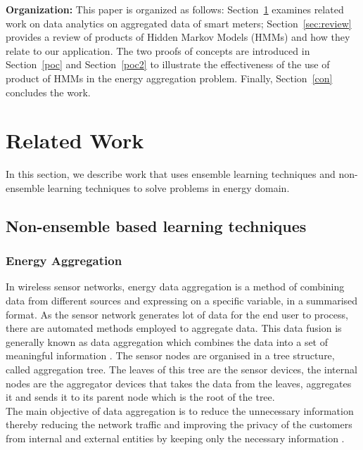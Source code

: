 \documentclass[conference]{IEEEtran}
\begin{document}
\noindent \textbf{Organization:} This paper is organized as follows: Section~\ref{related} examines related work on data analytics on aggregated data of smart meters; Section~\ref{sec:review} provides a review of products of Hidden Markov Models (HMMs) and how they relate to our application. The two proofs of concepts are introduced in Section~\ref{poc} and Section~\ref{poc2} to illustrate the effectiveness of the use of product of HMMs in the energy aggregation problem. Finally, Section~\ref{con} concludes the work.


\section{Related Work}
\label{related}
In this section, we describe work that uses ensemble learning techniques and non-ensemble learning techniques to solve problems in energy domain.
\subsection{Non-ensemble based learning techniques}

\subsubsection{Energy Aggregation}
In wireless sensor networks, energy data aggregation is a method of combining data from different sources and expressing on a specific variable, in a summarised format. As the sensor network generates lot of data for the end user to process, there are automated methods employed to aggregate data. This data fusion is generally known as data aggregation which combines the data into a set of meaningful information \cite{Heinzelman00energy}.
The sensor nodes are organised in a tree structure, called aggregation tree. The leaves of this tree are the sensor devices, the internal nodes are the aggregator devices that takes the data from the leaves, aggregates it and sends it to its parent node which is the root of the tree. \\
The main objective of data aggregation is to reduce the unnecessary information thereby reducing the network traffic and improving the privacy of the customers from internal and external entities by keeping only the necessary information \cite{taban}. 


\end{document}
